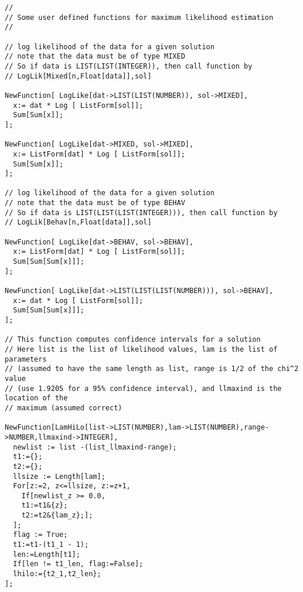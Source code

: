 {\scriptsize
\begin{verbatim}
//
// Some user defined functions for maximum likelihood estimation
// 

// log likelihood of the data for a given solution
// note that the data must be of type MIXED
// So if data is LIST(LIST(INTEGER)), then call function by  
// LogLik[Mixed[n,Float[data]],sol]

NewFunction[ LogLike[dat->LIST(LIST(NUMBER)), sol->MIXED], 
  x:= dat * Log [ ListForm[sol]];
  Sum[Sum[x]];
];

NewFunction[ LogLike[dat->MIXED, sol->MIXED], 
  x:= ListForm[dat] * Log [ ListForm[sol]];
  Sum[Sum[x]];
];

// log likelihood of the data for a given solution
// note that the data must be of type BEHAV
// So if data is LIST(LIST(LIST(INTEGER))), then call function by  
// LogLik[Behav[n,Float[data]],sol]

NewFunction[ LogLike[dat->BEHAV, sol->BEHAV], 
  x:= ListForm[dat] * Log [ ListForm[sol]];
  Sum[Sum[Sum[x]]];
];

NewFunction[ LogLike[dat->LIST(LIST(LIST(NUMBER))), sol->BEHAV], 
  x:= dat * Log [ ListForm[sol]];
  Sum[Sum[Sum[x]]];
];

// This function computes confidence intervals for a solution
// Here list is the list of likelihood values, lam is the list of parameters
// (assumed to have the same length as list, range is 1/2 of the chi^2 value
// (use 1.9205 for a 95% confidence interval), and llmaxind is the location of the 
// maximum (assumed correct) 

NewFunction[LamHiLo[list->LIST(NUMBER),lam->LIST(NUMBER),range->NUMBER,llmaxind->INTEGER],
  newlist := list -(list_llmaxind-range);
  t1:={};
  t2:={};
  llsize := Length[lam];
  For[z:=2, z<=llsize, z:=z+1,
    If[newlist_z >= 0.0, 
    t1:=t1&{z}; 
    t2:=t2&{lam_z};];
  ];
  flag := True;
  t1:=t1-(t1_1 - 1);
  len:=Length[t1];
  If[len != t1_len, flag:=False];
  lhilo:={t2_1,t2_len};
];
\end{verbatim}
}











